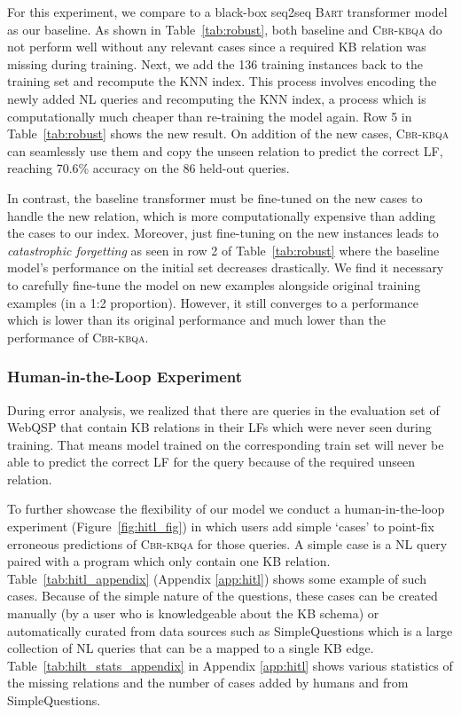 \documentclass{article}
\newcommand{\alg}{\textsc{Cbr-kbqa}\xspace}
\begin{document}
For this experiment, we compare to a black-box seq2seq \textsc{Bart} transformer model as our baseline. As shown in Table~\ref{tab:robust}, both baseline and \alg do not perform well without any relevant cases since a required KB relation was missing during training. Next, we add the 136 training instances back to the training set and recompute the KNN index. This process involves encoding the newly added NL queries and recomputing the KNN index, a process which is computationally much cheaper than re-training the model again. Row 5 in Table~\ref{tab:robust} shows the new result. On addition of the new cases, \alg can seamlessly use them and copy the unseen relation to predict the correct LF, reaching 70.6\% accuracy on the 86 held-out queries. 

In contrast, the baseline transformer must be fine-tuned on the new cases to handle the new relation, which is more computationally expensive than adding the cases to our index. Moreover, just fine-tuning on the new instances leads to \emph{catastrophic forgetting} as seen in row 2 of Table~\ref{tab:robust} where the baseline model's performance on the initial set decreases drastically. We find it necessary to carefully fine-tune the model on new examples alongside original training examples (in a 1:2 proportion). However, it still converges to a performance which is lower than its original performance and much lower than the performance of \alg.


\subsubsection{Human-in-the-Loop Experiment}
\label{subsub:hitl}
During error analysis, we realized that there are queries in the evaluation set of WebQSP that contain KB relations in their LFs which were never seen during training. That means model trained on the corresponding train set will never be able to predict the correct LF for the query because of the required unseen relation. 

To further showcase the flexibility of our model we conduct a human-in-the-loop experiment (Figure~\ref{fig:hitl_fig}) in which users add simple `cases' to point-fix erroneous predictions of \alg for those queries. A simple case is a NL query paired with a program which only contain one KB relation. Table~\ref{tab:hitl_appendix} (Appendix \ref{app:hitl}) shows some example of such cases. Because of the simple nature of the questions, these cases can be created manually (by a user who is knowledgeable about the KB schema) or automatically curated from data sources such as SimpleQuestions \cite{bordes2015large} which is a large collection of NL queries that can be a mapped to a single KB edge. Table~\ref{tab:hilt_stats_appendix} in Appendix \ref{app:hitl} shows various statistics of the missing relations and the number of cases added by humans and from SimpleQuestions. 
\end{document}
